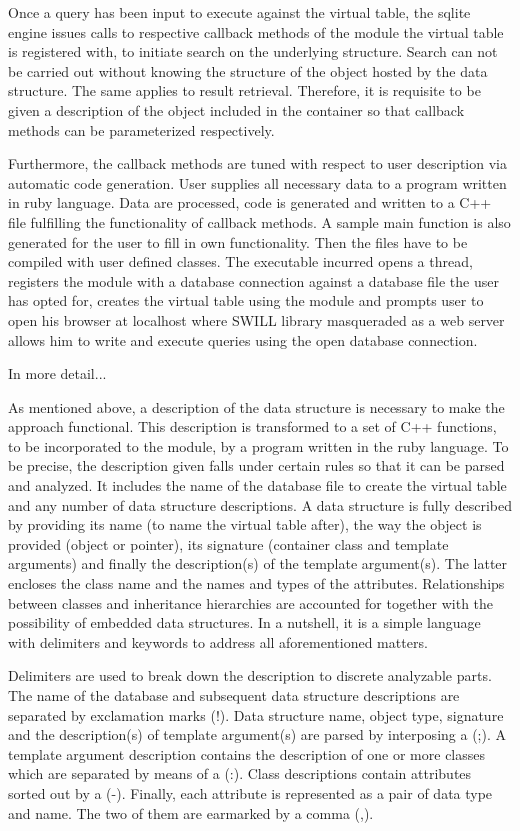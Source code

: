 \documentclass[pdftex, 11pt, a4paper]{report}
\begin{document}
\par
Once a query has been input to execute against the virtual table, the sqlite engine issues calls to respective callback methods of the module the virtual table is registered with, to initiate search on the underlying structure. Search can not be carried out without knowing the structure of the object hosted by the data structure. The same applies to result retrieval. Therefore, it is requisite to be given a description of the object included in the container so that callback methods can be parameterized respectively. 
\par
Furthermore, the callback methods are tuned with respect to user description via automatic code generation. User supplies all necessary data to a program written in ruby language. Data are processed, code is generated and written to a C++ file fulfilling the functionality of callback methods. A sample main function is also generated for the user to fill in own functionality. Then the files have to be compiled with user defined classes. The executable incurred opens a thread, registers the module with a database connection against a database file the user has opted for, creates the virtual table using the module and prompts user to open his browser at localhost where SWILL library masqueraded as a web server allows him to write and execute queries using the open database connection.
\par
In more detail...
\par
As mentioned above, a description of the data structure is necessary to make the approach functional. This description is transformed to a set of C++ functions, to be incorporated to the module, by a program written in the ruby language. To be precise, the description given falls under certain rules so that it can be parsed and analyzed. It includes the name of the database file to create the virtual table and any number of data structure descriptions. A data structure is fully described by providing its name (to name the virtual table after), the way the object is provided (object or pointer), its signature (container class and template arguments) and finally the description(s) of the template argument(s). The latter encloses the class name and the names and types of the attributes. Relationships between classes and inheritance hierarchies are accounted for together with the possibility of embedded data structures. In a nutshell, it is a simple language with delimiters and keywords to address all aforementioned matters.
\par
Delimiters are used to break down the description to discrete analyzable parts. The name of the database and subsequent data structure descriptions are separated by exclamation marks (!). Data structure name, object type, signature and the description(s) of template argument(s) are parsed by interposing a (;). A template argument description contains the description of one or more classes which are separated by means of a (:). Class descriptions contain attributes sorted out by a (-). Finally, each attribute is represented as a pair of data type and name. The two of them are earmarked by a comma (,).
\end{document}

